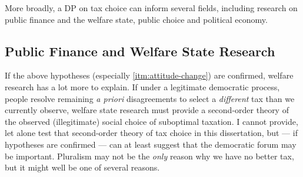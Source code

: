 		
		



More broadly, a \gls{DP} on tax choice can inform several fields, including research on public finance and the welfare state, public choice and political economy.

\subsection{Public Finance and Welfare State Research}
If the above hypotheses (especially \ref{itm:attitude-change}) are confirmed, welfare research has a lot more to explain.
If under a legitimate democratic process, people resolve remaining \emph{a priori} disagreements to select a \emph{different} tax than we currently observe, welfare state research must provide a second-order theory of the observed (illegitimate) social choice of suboptimal taxation.
I cannot provide, let alone test that second-order theory of tax choice in this dissertation, but --- if hypotheses are confirmed --- can at least suggest that the democratic forum may be important.
Pluralism may not be the \emph{only} reason why we have no better tax, but it might well be one of several reasons.

